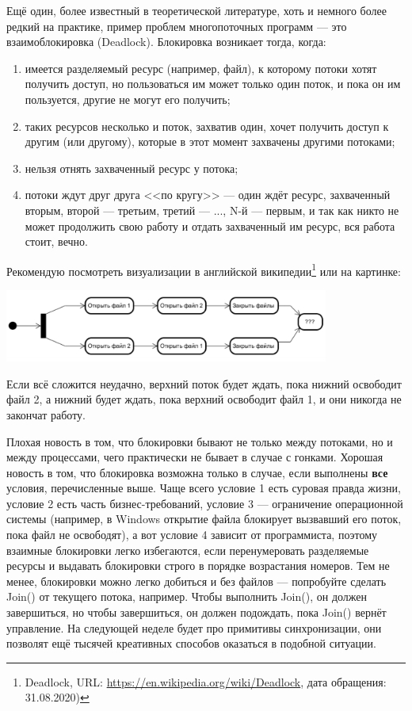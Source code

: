 \documentclass{../../text-style}
\begin{document}
Ещё один, более известный в теоретической литературе, хоть и немного более редкий на практике, пример проблем многопоточных программ --- это взаимоблокировка (Deadlock). Блокировка возникает тогда, когда:
\begin{enumerate}
    \item имеется разделяемый ресурс (например, файл), к которому потоки хотят получить доступ, но пользоваться им может только один поток, и пока он им пользуется, другие не могут его получить;
    \item таких ресурсов несколько и поток, захватив один, хочет получить доступ к другим (или другому), которые в этот момент захвачены другими потоками;
    \item нельзя отнять захваченный ресурс у потока;
    \item потоки ждут друг друга <<по кругу>> --- один ждёт ресурс, захваченный вторым, второй --- третьим, третий --- ..., N-й --- первым, и так как никто не может продолжить свою работу и отдать захваченный им ресурс, вся работа стоит, вечно.
\end{enumerate}

Рекомендую посмотреть визуализации в английской википедии\footnote{Deadlock, URL: \url{https://en.wikipedia.org/wiki/Deadlock}, дата обращения: 31.08.2020)} или на картинке: 

\begin{center}
    \includegraphics[width=0.8\textwidth]{deadlock.png}
\end{center}

Если всё сложится неудачно, верхний поток будет ждать, пока нижний освободит файл 2, а нижний будет ждать, пока верхний освободит файл 1, и они никогда не закончат работу.

Плохая новость в том, что блокировки бывают не только между потоками, но и между процессами, чего практически не бывает в случае с гонками. Хорошая новость в том, что блокировка возможна только в случае, если выполнены \textbf{все} условия, перечисленные выше. Чаще всего условие 1 есть суровая правда жизни, условие 2 есть часть бизнес-требований, условие 3 --- ограничение операционной системы (например, в Windows открытие файла блокирует вызвавший его поток, пока файл не освободят), а вот условие 4 зависит от программиста, поэтому взаимные блокировки легко избегаются, если перенумеровать разделяемые ресурсы и выдавать блокировки строго в порядке возрастания номеров. Тем не менее, блокировки можно легко добиться и без файлов --- попробуйте сделать Join() от текущего потока, например. Чтобы выполнить Join(), он должен завершиться, но чтобы завершиться, он должен подождать, пока Join() вернёт управление. На следующей неделе будет про примитивы синхронизации, они позволят ещё тысячей креативных способов оказаться в подобной ситуации.
\end{document}
